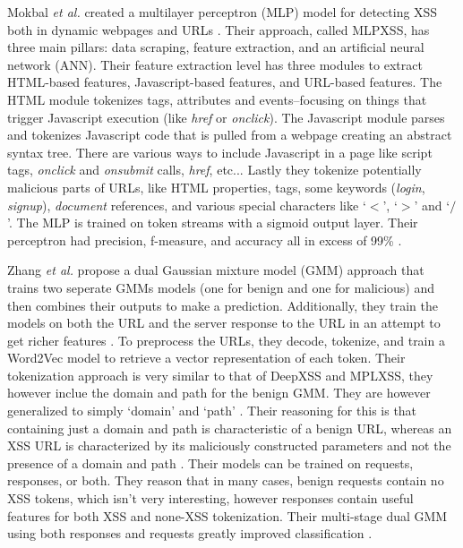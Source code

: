 Mokbal \textit{et al.} created a multilayer perceptron (MLP) model for detecting XSS both in dynamic webpages and URLs \cite{mokbal2019mlpxss}. Their approach, called MLPXSS, has three main pillars: data scraping, feature extraction, and an artificial neural network (ANN). Their feature extraction level has three modules to extract HTML-based features, Javascript-based features, and URL-based features. The HTML module tokenizes tags, attributes and events--focusing on things that trigger Javascript execution (like \textit{href} or \textit{onclick}). The Javascript module parses and tokenizes Javascript code that is pulled from a webpage creating an abstract syntax tree. There are various ways to include Javascript in a page like script tags, \textit{onclick} and \textit{onsubmit} calls, \textit{href}, etc... Lastly they tokenize potentially malicious parts of URLs, like HTML properties, tags, some keywords (\textit{login}, \textit{signup}), \textit{document} references, and various special characters like `$<$', `$>$' and `$/$'. The MLP is trained on token streams with a sigmoid output layer. Their perceptron had precision, f-measure, and accuracy all in excess of 99\% \cite{mokbal2019mlpxss}.

Zhang \textit{et al.} propose a dual Gaussian mixture model (GMM) approach that trains two seperate GMMs models (one for benign and one for malicious) and then combines their outputs to make a prediction. Additionally, they train the models on both the URL and the server response to the URL in an attempt to get richer features \cite{zhang2019cross}. To preprocess the URLs, they decode, tokenize, and train a Word2Vec model to retrieve a vector representation of each token. Their tokenization approach is very similar to that of DeepXSS and MPLXSS, they however inclue the domain and path for the benign GMM. They are however generalized to simply `domain' and `path' \cite{zhang2019cross}. Their reasoning for this is that containing just a domain and path is characteristic of a benign URL, whereas an XSS URL is characterized by its maliciously constructed parameters and not the presence of a domain and path \cite{zhang2019cross}. Their models can be trained on requests, responses, or both. They reason that in many cases, benign requests contain no XSS tokens, which isn't very interesting, however responses contain useful features for both XSS and none-XSS tokenization. Their multi-stage dual GMM using both responses and requests greatly improved classification \cite{zhang2019cross}.

